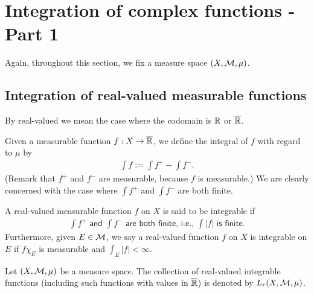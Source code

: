 \section{Integration of complex functions - Part 1}
Again, throughout this section, we fix a measure space $(X, {\mathcal{M}}, \mu)$.

\subsection{Integration of real-valued measurable functions}

\begin{rmk}
    By real-valued we mean the case where the codomain is ${\mathbb{R}}$ or $\overline{{\mathbb{R}}}$.
\end{rmk}
Given a measurable function $f: X\rightarrow\overline{{\mathbb{R}}}$, we define the integral of $f$ with regard to $\mu$ by
\begin{align*}
    \int f:=\int f^+-\int f^-.
\end{align*}
(Remark that $f^+$ and $f^-$ are measurable, because $f$ is measurable.)
We are clearly concerned with the case where $\int f^+$ and $\int f^-$ are both finite.
\begin{defi}
    A real-valued measurable function $f$ on $X$ is said to be integrable if
    \begin{align*}
        \textsf{$\int f^+$ and $\int f^-$ are both finite, i.e., $\int |f|$ is finite.}
    \end{align*}
    Furthermore, given $E\in{\mathcal{M}}$, we say a real-valued function $f$ on $X$ is integrable on $E$ if $f\chi_E$ is measurable and $\int_E |f|<\infty$.
\end{defi}
\begin{nota}
    Let $(X, {\mathcal{M}}, \mu)$ be a measure space.
    The collection of real-valued integrable functions (including such functions with values in $\overline{{\mathbb{R}}}$) is denoted by $L_r(X, {\mathcal{M}}, \mu)$.
\end{nota}

